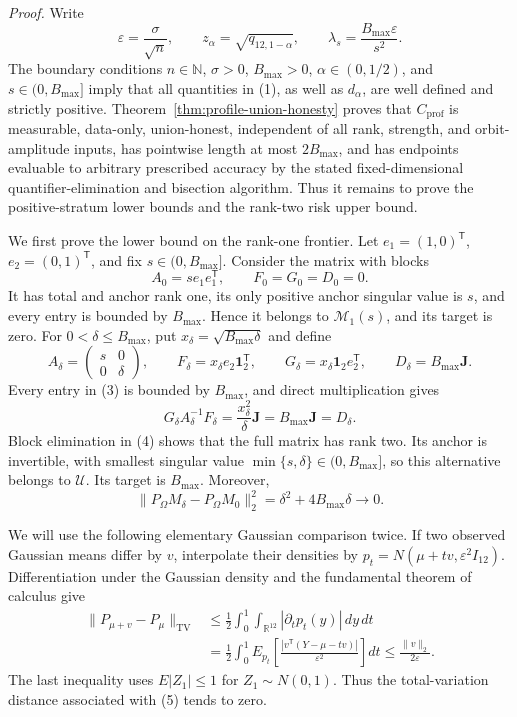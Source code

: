 \textit{Proof.}
Write
\[
 \varepsilon=\frac{\sigma}{\sqrt n},\qquad
 z_\alpha=\sqrt{q_{12,1-\alpha}},\qquad
 \lambda_s=\frac{B_{\max}\varepsilon}{s^2}.
\tag{1}
\]
The boundary conditions \(n\in\mathbb N\), \(\sigma>0\),
\(B_{\max}>0\), \(\alpha\in(0,1/2)\), and
\(s\in(0,B_{\max}]\) imply that all quantities in (1), as well as
\(d_\alpha\), are well defined and strictly positive.
Theorem~\ref{thm:profile-union-honesty} proves that
\(C_{\mathrm{prof}}\) is measurable, data-only, union-honest, independent
of all rank, strength, and orbit-amplitude inputs, has pointwise length at
most \(2B_{\max}\), and has endpoints evaluable to arbitrary prescribed
accuracy by the stated fixed-dimensional quantifier-elimination and bisection
algorithm.  Thus it remains to prove the positive-stratum lower bounds and the
rank-two risk upper bound.

We first prove the lower bound on the rank-one frontier.  Let
\(e_1=(1,0)^{\mathsf T}\), \(e_2=(0,1)^{\mathsf T}\), and fix
\(s\in(0,B_{\max}]\).  Consider the matrix with blocks
\[
 A_0=se_1e_1^{\mathsf T},\qquad F_0=G_0=D_0=0.
\tag{2}
\]
It has total and anchor rank one, its only positive anchor singular value is
\(s\), and every entry is bounded by \(B_{\max}\).  Hence it belongs to
\(\mathcal M_1(s)\), and its target is zero.  For
\(0<\delta\leq B_{\max}\), put
\(x_\delta=\sqrt{B_{\max}\delta}\) and define
\[
 A_\delta=\begin{pmatrix}s&0\\0&\delta\end{pmatrix},\qquad
 F_\delta=x_\delta e_2\mathbf1_2^{\mathsf T},\qquad
 G_\delta=x_\delta\mathbf1_2e_2^{\mathsf T},\qquad
 D_\delta=B_{\max}\mathbf J.
\tag{3}
\]
Every entry in (3) is bounded by \(B_{\max}\), and direct multiplication
gives
\[
 G_\delta A_\delta^{-1}F_\delta
 =\frac{x_\delta^2}{\delta}\mathbf J
 =B_{\max}\mathbf J=D_\delta.
\tag{4}
\]
Block elimination in (4) shows that the full matrix has rank two.  Its anchor
is invertible, with smallest singular value
\(\min\{s,\delta\}\in(0,B_{\max}]\), so this alternative belongs to
\(\mathcal U\).  Its target is \(B_{\max}\).  Moreover,
\[
 \lVert P_\Omega M_\delta-P_\Omega M_0\rVert_2^2
 =\delta^2+4B_{\max}\delta\longrightarrow0.
\tag{5}
\]

We will use the following elementary Gaussian comparison twice.  If two
observed Gaussian means differ by \(v\), interpolate their densities by
\(p_t=N(\mu+tv,\varepsilon^2I_{12})\).  Differentiation under the Gaussian
density and the fundamental theorem of calculus give
\[
 \begin{split}
 \lVert P_{\mu+v}-P_\mu\rVert_{\mathrm{TV}}
 &\leq\frac12\int_0^1\int_{\mathbb R^{12}}
       |\partial_tp_t(y)|\,dy\,dt\\
 &=\frac12\int_0^1E_{p_t}\!\left[
 \frac{|v^{\mathsf T}(Y-\mu-tv)|}{\varepsilon^2}\right]dt
 \leq\frac{\lVert v\rVert_2}{2\varepsilon}.
 \end{split}
\tag{6}
\]
The last inequality uses \(E|Z_1|\leq1\) for \(Z_1\sim N(0,1)\).
Thus the total-variation distance associated with (5) tends to zero.

